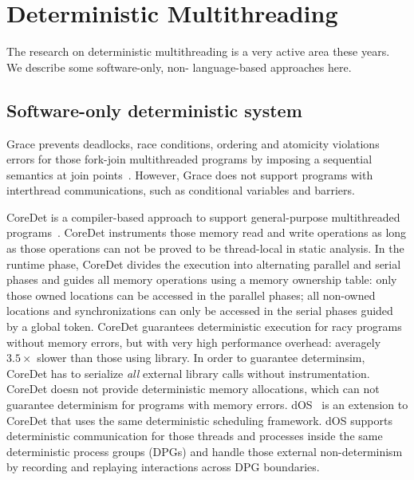 \section{Deterministic Multithreading}
The research on deterministic multithreading is a very active area these years. We describe some software-only, non- language-based approaches here.

\subsection{Software-only deterministic system}
Grace prevents deadlocks, race conditions, ordering and atomicity violations errors for those fork-join multithreaded programs by imposing a sequential semantics at join points~\cite{grace}. However, Grace does not support programs with interthread communications, such as conditional variables and barriers.

CoreDet is a compiler-based approach to 
support general-purpose multithreaded programs~\cite{Bergan:2010:CCR:1736020.1736029}. 
CoreDet instruments those memory read and write operations as long
as those operations can not be proved to be thread-local in static analysis. 
In the runtime phase, CoreDet divides the execution into 
alternating parallel and serial phases and guides all memory operations 
using a memory ownership table: only those owned locations can be accessed
in the parallel phases; all non-owned locations and synchronizations can only 
be accessed in the serial phases guided by a global token.
CoreDet guarantees deterministic execution for racy programs without memory errors,
but with very high performance overhead: 
averagely $3.5\times$ slower than those using \pthreads{} library.
In order to guarantee determinsim, 
CoreDet has to serialize \emph{all} external library calls without instrumentation.
CoreDet doesn not provide deterministic 
memory allocations, which can not guarantee determinism for programs with memory errors.  
dOS~\cite{deterministic-process-groups} is an extension to CoreDet
that uses the same deterministic scheduling framework.  dOS 
supports deterministic communication for those threads and processes inside the same
deterministic process groups (DPGs) and handle those external non-determinism by recording and
replaying interactions across DPG boundaries. 

